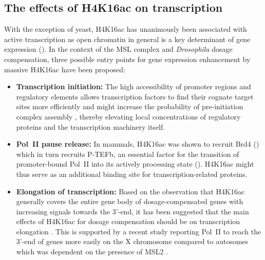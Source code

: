 \subsection{The effects of H4K16ac on transcription}
With the exception of yeast, H4K16ac has unanimously been associated with active transcription as open chromatin in general is a key determinant of gene expression (\citet{Lee2007, Henikoff2011}). In the context of the MSL complex and \textit{Drosophila} dosage compensation, three possible entry points for gene expression enhancement by massive H4K16ac have been proposed: 
\begin{itemize}
\item \textbf{Transcription initiation:} The high accessibility of promoter regions and regulatory elements allows transcription factors to find their cognate target sites more efficiently \citep{Chen2014} and might increase the probability of pre-initiation complex assembly \citep{Conrad2012b}, thereby elevating local concentrations of regulatory proteins and the transcription machinery itself.
\item \textbf{Pol~II pause release:} In mammals, H4K16ac was shown to recruit Brd4 () which in turn recruits P-TEFb, an essential factor for the transition of promoter-bound Pol~II into its actively processing state \citep{Zippo2009} (). H4K16ac might thus serve as an additional binding site for transcription-related proteins.
\item \textbf{Elongation of transcription:} Based on the observation that H4K16ac generally covers the entire gene body of dosage-compensated genes with increasing signals towards the 3’-end, it has been suggested that the main effects of H4K16ac for dosage compensation should be on transcription elongation \citep{Smith2001}. This is supported by a recent study reporting Pol~II to reach the 3’-end of genes more easily on the X chromosome compared to autosomes which was dependent on the presence of MSL2 \citep{Larschan2011}. 
\end{itemize}
